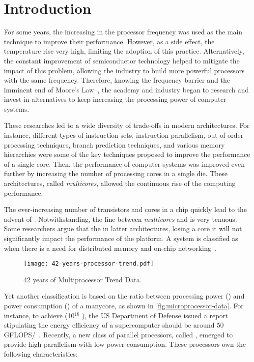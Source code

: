 \chapter{Introduction}
\label{ch.intro}

	For some years, the increasing in the processor frequency was used
	as the main technique to improve their performance.  However, as a
	side effect, the temperature rise very high, limiting the adoption
	of this practice.  Alternatively, the constant improvement of
	semiconductor technology helped to mitigate the impact of this
	problem, allowing the industry to build more powerful processors
	with the same frequency.  Therefore, knowing the frequency barrier
	and the imminent end of Moore's Law~\cite{moore:1965}, the academy
	and industry began to research and invest in alternatives to keep
	increasing the processing power of computer systems.

	These researches led to a wide diversity of trade-offs in modern
	architectures.  For instance, different types of instruction sets,
	instruction parallelism, out-of-order processing techniques, branch
	prediction techniques, and various memory hierarchies were some of
	the key techniques proposed to improve the performance of a single
	core.  Then, the performance of computer systems was improved even
	further by increasing the number of processing cores in a single
	die.  These architectures, called \textit{multicores}, allowed the
	continuous rise of the computing performance.

	The ever-increasing number of transistors and cores in a chip
	quickly lead to the advent of \manycores.  Notwithstanding, the line
	between \textit{multicores} and \manycores is very tenuous.  Some
	researchers argue that the in latter architectures, losing a core it
	will not significantly impact the performance of the platform.  A
	system is classified as \manycore when there is a need for
	distributed memory and on-chip networking~\cite{freitas:thesis}.

	\begin{figure}[t]
		\centering%
		\caption{42 years of Multiprocessor Trend Data.}%
		\label{fig:microprocessor-data}%
		\texttt{[image: 42-years-processor-trend.pdf]}%
	\end{figure}

	Yet another classification is based on the ratio between processing
	power (\flops) and power consumption (\watts) of a manycore, as
	shown in \autoref{fig:microprocessor-data}.  For instance, to
	achieve \exascale (10$^{18}$ \flops), the US Department of Defense
	issued a report stipulating the energy efficiency of a supercomputer
	should be around 50 GFLOPS/\watts~\cite{darpa:exascale}.  Recently,
	a new class of parallel processors, called \lightweight \manycores,
	emerged to provide high parallelism with low power consumption.
	These processors own the following characteristics:

